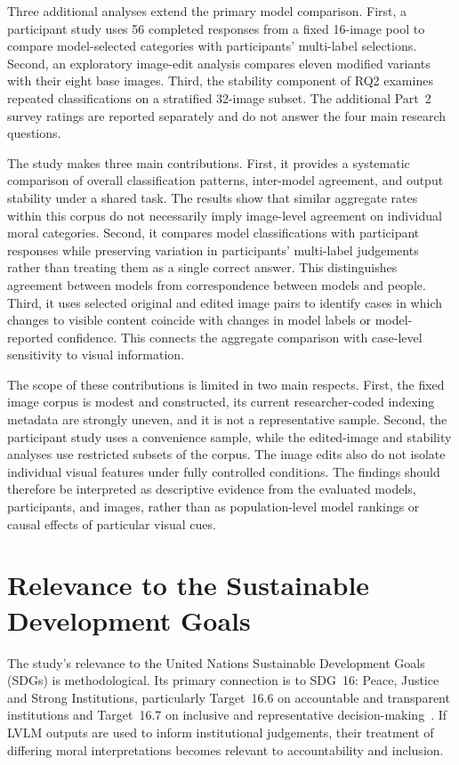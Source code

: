 Three additional analyses extend the primary model comparison. First, a
participant study uses 56 completed responses from a fixed 16-image pool to
compare model-selected categories with participants' multi-label selections.
Second, an exploratory image-edit analysis compares eleven modified variants
with their eight base images. Third, the stability component of RQ2 examines
repeated classifications on a stratified 32-image subset. The additional
Part~2 survey ratings are reported separately and do not answer the four main
research questions.

The study makes three main contributions. First, it provides a systematic
comparison of overall classification patterns, inter-model agreement, and
output stability under a shared task. The results show that similar aggregate
rates within this corpus do not necessarily imply image-level agreement on
individual moral categories.
Second, it compares model classifications with participant responses while
preserving variation in participants' multi-label judgements rather than
treating them as a single correct answer. This distinguishes agreement between
models from correspondence between models and people. Third, it uses selected
original and edited image pairs to identify cases in which changes to visible
content coincide with changes in model labels or model-reported confidence.
This connects the aggregate comparison with case-level sensitivity to visual
information.

The scope of these contributions is limited in two main respects. First, the
fixed image corpus is modest and constructed, its current researcher-coded
indexing metadata are strongly uneven, and it is not a representative sample.
Second, the participant study uses a convenience
sample, while the edited-image and stability analyses use restricted subsets
of the corpus. The image edits also do not isolate individual visual features
under fully controlled conditions. The findings should therefore be
interpreted as descriptive evidence from the evaluated models, participants,
and images, rather than as population-level model rankings or causal effects
of particular visual cues.


\section{Relevance to the Sustainable Development Goals}
\label{sec:sdg_relevance}

The study's relevance to the United Nations Sustainable Development Goals
(SDGs) is methodological. Its primary connection is to
SDG~16: Peace, Justice and Strong Institutions, particularly Target~16.6 on
accountable and transparent institutions and Target~16.7 on inclusive and
representative decision-making~\cite{un2015agenda}. If LVLM outputs are used to inform
institutional judgements, their treatment of differing moral interpretations
becomes relevant to accountability and inclusion.

